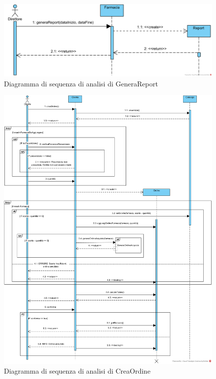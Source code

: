 \begin{figure}[!hbp]
	\centering
	\includegraphics[width=0.8\linewidth]{assets/sequence_analisi/SequenceAnalisiGeneraReport.png}
	\caption{Diagramma di sequenza di analisi di GeneraReport}
\end{figure}

\begin{figure}[!hbp]
	\centering
	\includegraphics[width=\linewidth]{assets/sequence_analisi/SequenceAnalisiCreaOrdine.png}
	\caption{Diagramma di sequenza di analisi di CreaOrdine}
\end{figure}

